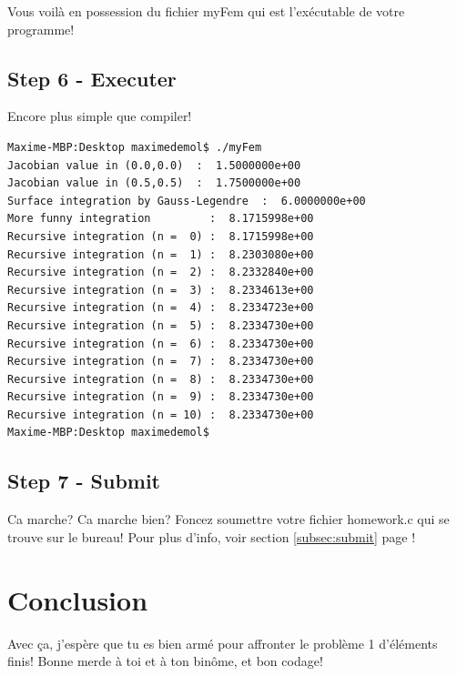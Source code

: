 \documentclass[11pt,a4paper]{article}
\begin{document}
Vous voilà en possession du fichier myFem qui est l'exécutable de votre programme!

\subsection{Step 6 - Executer}

Encore plus simple que compiler!

\begin{lstlisting}[style=Bash]
Maxime-MBP:Desktop maximedemol$ ./myFem
Jacobian value in (0.0,0.0)  :  1.5000000e+00 
Jacobian value in (0.5,0.5)  :  1.7500000e+00 
Surface integration by Gauss-Legendre  :  6.0000000e+00 
More funny integration         :  8.1715998e+00 
Recursive integration (n =  0) :  8.1715998e+00 
Recursive integration (n =  1) :  8.2303080e+00 
Recursive integration (n =  2) :  8.2332840e+00 
Recursive integration (n =  3) :  8.2334613e+00 
Recursive integration (n =  4) :  8.2334723e+00 
Recursive integration (n =  5) :  8.2334730e+00 
Recursive integration (n =  6) :  8.2334730e+00 
Recursive integration (n =  7) :  8.2334730e+00 
Recursive integration (n =  8) :  8.2334730e+00 
Recursive integration (n =  9) :  8.2334730e+00 
Recursive integration (n = 10) :  8.2334730e+00 
Maxime-MBP:Desktop maximedemol$ 
\end{lstlisting}
\vspace{12pt}

\subsection{Step 7 - Submit}

Ca marche? Ca marche bien? Foncez soumettre votre fichier homework.c qui se trouve sur le bureau! Pour plus d'info, voir section \ref{subsec:submit} page \pageref{subsec:submit}!

\section{Conclusion}

Avec ça, j'espère que tu es bien armé pour affronter le problème 1 d'éléments finis! Bonne merde à toi et à ton binôme, et bon codage!
\end{document}
